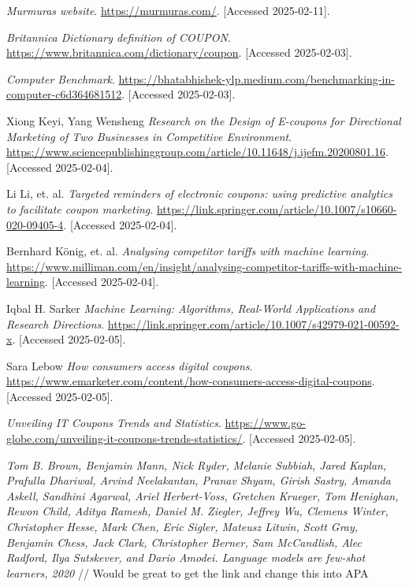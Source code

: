 \documentclass[licencjacka,en]{pracamgr}
\begin{document}
\begin{thebibliography}{99}


\textit{Murmuras website}.  
\url{https://murmuras.com/}.  
[Accessed 2025-02-11].

\textit{Britannica Dictionary definition of COUPON}.  
\url{https://www.britannica.com/dictionary/coupon}.  
[Accessed 2025-02-03].

\textit{Computer Benchmark}.  
\url{https://bhatabhishek-ylp.medium.com/benchmarking-in-computer-c6d364681512}.  
[Accessed 2025-02-03].

Xiong Keyi, Yang Wensheng
\textit{Research on the Design of E-coupons for Directional Marketing of Two Businesses in Competitive Environment}.  
\url{https://www.sciencepublishinggroup.com/article/10.11648/j.ijefm.20200801.16}.  
[Accessed 2025-02-04].

Li Li, et. al.
\textit{Targeted reminders of electronic coupons: using predictive analytics to facilitate coupon marketing}.  
\url{https://link.springer.com/article/10.1007/s10660-020-09405-4}.  
[Accessed 2025-02-04].

Bernhard König, et. al.
\textit{Analysing competitor tariffs with machine learning}.  
\url{https://www.milliman.com/en/insight/analysing-competitor-tariffs-with-machine-learning}.  
[Accessed 2025-02-04].

Iqbal H. Sarker
\textit{Machine Learning: Algorithms, Real-World Applications and Research Directions}.  
\url{https://link.springer.com/article/10.1007/s42979-021-00592-x}.  
[Accessed 2025-02-05].

Sara Lebow 
\textit{How consumers access digital coupons}.  
\url{https://www.emarketer.com/content/how-consumers-access-digital-coupons}.  
[Accessed 2025-02-05].

\textit{Unveiling IT Coupons Trends and Statistics}.  
\url{https://www.go-globe.com/unveiling-it-coupons-trends-statistics/}.  
[Accessed 2025-02-05].

\textit{Tom B. Brown, Benjamin Mann, Nick Ryder, Melanie Subbiah, Jared
Kaplan, Prafulla Dhariwal, Arvind Neelakantan, Pranav Shyam, Girish
Sastry, Amanda Askell, Sandhini Agarwal, Ariel Herbert-Voss, Gretchen
Krueger, Tom Henighan, Rewon Child, Aditya Ramesh, Daniel M.
Ziegler, Jeffrey Wu, Clemens Winter, Christopher Hesse, Mark Chen,
Eric Sigler, Mateusz Litwin, Scott Gray, Benjamin Chess, Jack Clark,
Christopher Berner, Sam McCandlish, Alec Radford, Ilya Sutskever, and
Dario Amodei. Language models are few-shot learners, 2020}
// Would be great to get the link and change this into APA


\end{thebibliography}
\end{document}
